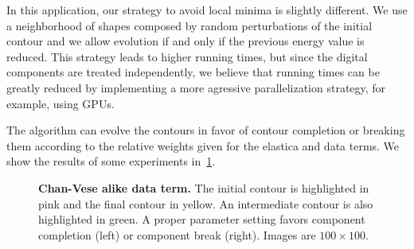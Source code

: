 \documentclass[review]{siamart220329}
\begin{document}
In this application, our strategy to avoid local minima is slightly different.
We use a neighborhood of shapes composed by random perturbations of the initial
contour and we allow evolution if and only if the previous energy value is
reduced. This strategy leads to higher running times, but since the digital
components are treated independently, we believe that running times can be
greatly reduced by implementing a more agressive parallelization strategy, for
example, using GPUs. 

The algorithm can evolve the contours in favor of contour completion or breaking
them according to the relative weights given for the elastica and data terms. We
show the results of some experiments in~\cref{fig:GF-chan-vese-alike}.


\begin{figure}
\center
{}\hspace{1em}%
%
\caption{\textbf{Chan-Vese alike data term.} The initial contour is highlighted
in pink and the final contour in yellow. An intermediate contour is also
highlighted in green. A proper parameter setting favors component completion
(left) or component break (right). Images are $100\times100$. }
\label{fig:GF-chan-vese-alike}
\end{figure}
%
%
\end{document}
